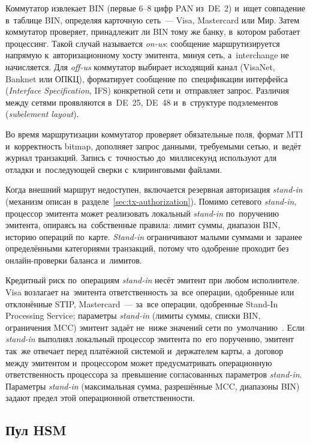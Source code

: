 Коммутатор извлекает BIN (первые 6--8 цифр PAN из~DE~2) и~ищет совпадение
в~таблице BIN, определяя карточную сеть~--- Visa, Mastercard или Мир. Затем
коммутатор проверяет, принадлежит ли BIN тому же банку, в~котором работает процессинг.
Такой случай называется \textit{on-us}: сообщение маршрутизируется напрямую
к~авторизационному хосту эмитента, минуя сеть, а~interchange не начисляется.
Для \textit{off-us} коммутатор выбирает исходящий канал (VisaNet, Banknet или
ОПКЦ), форматирует сообщение по~спецификации интерфейса (\textit{Interface
Specification}, IFS) конкретной сети
и~отправляет запрос. Различия между сетями проявляются в~DE~25, DE~48
и~в~структуре подэлементов (\textit{subelement layout}).

Во время маршрутизации коммутатор проверяет обязательные поля, формат MTI
и~корректность bitmap, дополняет запрос данными, требуемыми сетью, и~ведёт
журнал транзакций. Запись с~точностью до~миллисекунд используют для отладки
и~последующей сверки с~клиринговыми файлами.

Когда внешний маршрут недоступен, включается резервная авторизация
\textit{stand-in} (механизм описан в~разделе~\ref{sec:tx-authorization}).
Помимо сетевого \textit{stand-in}, процессор эмитента может реализовать локальный
\textit{stand-in} по~поручению эмитента, опираясь на~собственные правила: лимит
суммы, диапазон BIN, историю операций по~карте. \textit{Stand-in} ограничивают
малыми суммами и~заранее определёнными категориями транзакций, потому что
одобрение проходит без онлайн-проверки баланса
и~лимитов.~\cite{visa-core-rules,mc-rules}

Кредитный риск по~операциям \textit{stand-in} несёт эмитент при любом
исполнителе. Visa возлагает на~эмитента ответственность за~все операции,
одобренные или отклонённые STIP, Mastercard~--- за~все операции, одобренные
Stand-In Processing Service; параметры \textit{stand-in} (лимиты суммы, списки
BIN, ограничения MCC) эмитент задаёт не~ниже значений сети
по~умолчанию~\cite{visa-core-rules,mc-tpr}. Если \textit{stand-in} выполнял
локальный процессор эмитента по~его поручению, эмитент так~же отвечает перед
платёжной системой и~держателем карты, а~договор между
эмитентом и~процессором может предусматривать операционную ответственность
процессора за~превышение согласованных параметров \textit{stand-in}. Параметры
\textit{stand-in} (максимальная сумма, разрешённые MCC, диапазоны BIN) задают
предел этой операционной ответственности.

\subsection*{Пул HSM}

